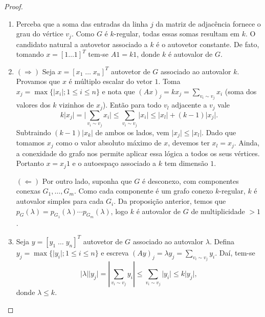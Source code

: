 \documentclass{article}
\begin{document}
\begin{proof}
    \begin{enumerate}
        \item [a.] Perceba que a soma das entradas da linha \(j\) da matriz de adjacência fornece o grau do vértice \(v_j\). Como \(G\) é \(k\)-regular, todas essas somas resultam em \(k\). O candidato natural a autovetor associado a \(k\) é o autovetor constante. De fato, tomando \(x=[1 \ldots 1]^T\) tem-se \(A1 = k1\), donde \(k\) é autovalor de \(G\).
        \item [b.] \((\Rightarrow)\) Seja \(x = [x_1 \; \ldots \; x_n]^T\) autovetor de \(G\) associado ao autovalor \(k\). Provamos que \(x\) é múltiplo escalar do vetor \(1\). Toma \(x_j = \max\{\vert x_i \vert; 1 \leq i \leq n\}\) e nota que \((Ax)_j = kx_j = \sum_{v_i \sim v_j} x_i\) (soma dos valores dos \(k\) vizinhos de \(x_j\)). Então para todo \(v_l\) adjacente a \(v_j\) vale
        \begin{equation*}
            k \vert x_j \vert = \vert \sum_{v_i \sim v_j} x_i \vert \leq \sum_{v_i \sim v_j} \vert x_i \vert \leq \vert x_l \vert + (k-1) \vert x_j \vert.
        \end{equation*} Subtraindo \((k-1) \vert x_k \vert\) de ambos os lados, vem \(\vert x_j \vert \leq \vert x_l \vert\). Dado que tomamos \(x_j\) como o valor absoluto máximo de \(x\), devemos ter \(x_l = x_j\). Ainda, a conexidade do grafo nos permite aplicar essa lógica a todos os seus vértices. Portanto \(x = x_j1\) e o autoespaço associado a \(k\) tem dimensão \(1\).
        
        \((\Leftarrow)\) Por outro lado, suponha que \(G\) é desconexo, com componentes conexas \(G_1, \ldots, G_m\). Como cada componente é um grafo conexo \(k\)-regular, \(k\) é autovalor simples para cada \(G_i\). Da proposição anterior, temos que \(p_G(\lambda) = p_{G_1}(\lambda)\cdots p_{G_m}(\lambda)\), logo \(k\) é autovalor de \(G\) de multiplicidade \(>1\).
        \item [c.] Seja \(y = [y_1 \; \ldots \; y_n]^T\) autovetor de \(G\) associado ao autovalor \(\lambda\). Defina \(y_j = \max\{\vert y_i \vert; 1 \leq i \leq n\}\) e escreva \((Ay)_j = \lambda y_j = \sum_{v_i \sim v_j} y_i\). Daí, tem-se 
        \begin{equation*}
            \vert \lambda \vert \vert y_j \vert = \left\vert \sum_{v_i \sim v_j} y_i \right\vert \leq \sum_{v_i \sim v_j} \vert y_i \vert \leq k \vert y_j \vert,
        \end{equation*} donde \(\lambda \leq k\).
    \end{enumerate}
\end{proof}
\end{document}
